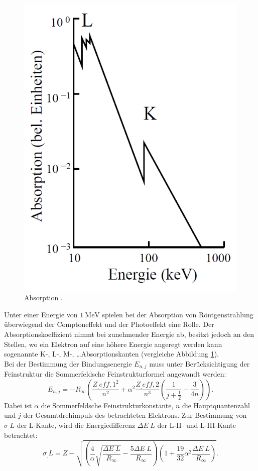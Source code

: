 \begin{figure}
\includegraphics[scale=0.3]{content/images/AbsorptionsSpektrum.png}
\caption{Absorption \cite{V602}.}
\label{fig:Absorption}
\end{figure}

\noindent Unter einer Energie von $\SI{1}{\mega\electronvolt}$ spielen bei der Absorption von Röntgenstrahlung überwiegend der Comptoneffekt und der Photoeffekt eine Rolle.
Der Absorptionskoeffizient nimmt bei zunehmender Energie ab, besitzt jedoch an den Stellen, wo ein Elektron auf eine höhere Energie angeregt werden kann sogenannte K-, L-, M-, \dots Absorptionskanten (vergleiche Abbildung \ref{fig:Absorption}).\\
Bei der Bestimmung der Bindungsenergie $E_{n,j}$ muss unter Berücksichtigung der Feinstruktur die Sommerfeldsche Feinstrukturformel angewandt werden:
\begin{equation}
E_{n,j} = -R_\infty\left(\frac{Z_.{eff,1}^2}{n^2}+\alpha^2\frac{Z_.{eff,2}}{n^3}\left(\frac{1}{j+\frac{1}{2}}-\frac{3}{4n}\right)\right)\text{.}
\end{equation}
Dabei ist $\alpha$ die Sommerfeldsche Feinstrukturkonstante, $n$ die Hauptquantenzahl und $j$ der Gesamtdrehimpuls des betrachteten Elektrons.
Zur Bestimmung von $\sigma_.L$ der L-Kante, wird die Energiedifferenz $\Delta E_.L$ der L-II- und L-III-Kante betrachtet:
\begin{equation}
\sigma_.L = Z-\sqrt{\left(\frac{4}{\alpha}\sqrt{\frac{\Delta E_.L}{R_\infty}}-\frac{5\Delta E_.L}{R_\infty}\right)\left(1+\frac{19}{32}\alpha^2\frac{\Delta E_.L}{R_\infty}\right)}\text{.}\label{eq:sigma_L}
\end{equation}

